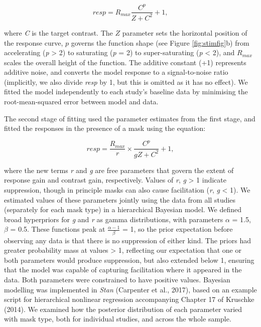 \documentclass[]{article}
\begin{document}
\begin{equation}
\label{eq:GC1}
resp = R_{max}\frac{C^p}{Z + C^2} + 1,
\end{equation}

where \emph{C} is the target contrast. The \(Z\) parameter sets the horizontal position of the response curve, \(p\) governs the function shape (see Figure \ref{fig:stimfig}b) from accelerating (\emph{p} \textgreater{} 2) to saturating (\emph{p} = 2) to super-saturating (\emph{p} \textless{} 2), and \(R_{max}\) scales the overall height of the function. The additive constant (+1) represents additive noise, and converts the model response to a signal-to-noise ratio (implicitly, we also divide \emph{resp} by 1, but this is omitted as it has no effect). We fitted the model independently to each study's baseline data by minimising the root-mean-squared error between model and data.

The second stage of fitting used the parameter estimates from the first stage, and fitted the responses in the presence of a mask using the equation:

\begin{equation}
\label{eq:GC2}
resp = \frac{R_{max}}{r} \times \frac{C^p}{gZ + C^2} + 1,
\end{equation}

where the new terms \emph{r} and \emph{g} are free parameters that govern the extent of response gain and contrast gain, respectively. Values of \emph{r}, \emph{g} \textgreater{} 1 indicate suppression, though in principle masks can also cause facilitation (\emph{r}, \emph{g} \textless{} 1). We estimated values of these parameters jointly using the data from all studies (separately for each mask type) in a hierarchical Bayesian model. We defined broad hyperpriors for \emph{g} and \emph{r} as gamma distributions, with parameters \(\alpha\) = 1.5, \(\beta\) = 0.5. These functions peak at \(\frac{\alpha-1}{\beta}\) = 1, so the prior expectation before observing any data is that there is no suppression of either kind. The priors had greater probability mass at values \textgreater{} 1, reflecting our expectation that one or both parameters would produce suppression, but also extended below 1, ensuring that the model was capable of capturing facilitation where it appeared in the data. Both parameters were constrained to have positive values. Bayesian modelling was implemented in \emph{Stan} (Carpenter et al., 2017), based on an example script for hierarchical nonlinear regression accompanying Chapter 17 of Kruschke (2014). We examined how the posterior distribution of each parameter varied with mask type, both for individual studies, and across the whole sample.
\end{document}
